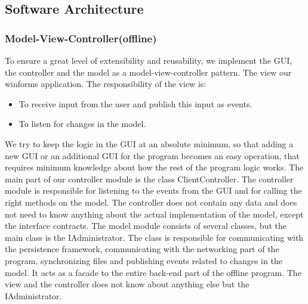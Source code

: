 \subsection{Software Architecture}
\subsubsection{Model-View-Controller(offline)}
To ensure a great level of extensibility and reusability, we implement the GUI, the controller and the model as a model-view-controller pattern. The view our winforms application. The responsibility of the view is:
\begin{itemize}
\item  To receive input from the user and publish this input as events. 
\item To listen for changes in the model. 
\end{itemize}
We try to keep the logic in the GUI at an absolute minimum, so that adding a new GUI or an additional GUI for the program becomes an easy operation, that requires minimum knowledge about how the rest of the program logic  works. The main part of our controller module is the class ClientController. The controller module is responsible for listening to the events from the GUI and for calling the right methods on the model. The controller does not contain any data and does not need to know anything about the actual implementation of the model, except the interface contracts. The model module consists of several classes, but the main class is the IAdministrator. The class is responsible for communicating with the persistence framework, communicating with the networking part of the program, synchronizing files and publishing events related to changes in the model. It acts as a facade to the entire back-end part of the offline program. The view and the controller does not know about anything else but the IAdministrator.
\newline
